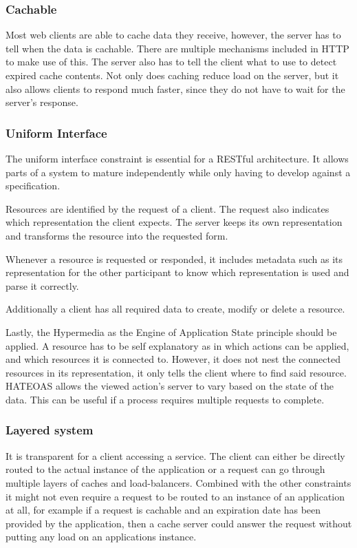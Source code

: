 \subsubsection{Cachable}

Most web clients are able to cache data they receive, however, the server has
to tell when the data is cachable. There are multiple mechanisms included in
HTTP to make use of this. The server also has to tell the client what to use to
detect expired cache contents. Not only does caching reduce load on the server, but
it also allows clients to respond much faster, since they do not have to wait
for the server's response.

\subsubsection{Uniform Interface}

The uniform interface constraint is essential for a RESTful architecture. It
allows parts of a system to mature independently while only having to develop
against a specification.

Resources are identified by the request of a client. The request also indicates
which representation the client expects. The server keeps its own representation
and transforms the resource into the requested form.

Whenever a resource is requested or responded, it includes metadata such as its
representation for the other participant to know which representation is used
and parse it correctly.

Additionally a client has all required data to create, modify or delete a
resource.

Lastly, the Hypermedia as the Engine of Application State principle should be
applied. A resource has to be self explanatory as in which actions can be
applied, and which resources it is connected to. However, it does not nest the
connected resources in its representation, it only tells the client where to
find said resource. HATEOAS allows the viewed action's server to vary based on
the state of the data. This can be useful if a process requires multiple
requests to complete.

\subsubsection{Layered system}

It is transparent for a client accessing a service. The client can either be
directly routed to the actual instance of the application or a request can go
through multiple layers of caches and load-balancers. Combined with the other
constraints it might not even require a request to be routed to an instance of
an application at all, for example if a request is cachable and an expiration
date has been provided by the application, then a cache server could answer the
request without putting any load on an applications instance.

